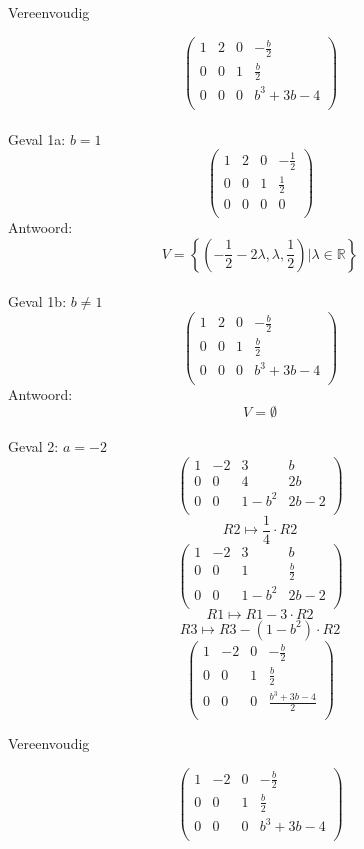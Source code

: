 \documentclass[10pt,a4paper]{article}
\begin{document}
\begin{center}
Vereenvoudig
\end{center}
\[
\begin{pmatrix}
1 & 2 & 0 & -\frac{b}{2}\\
0 & 0 & 1 & \frac{b}{2}\\
0 & 0 & 0 & b^{3}+3b-4\\
\end{pmatrix}
\]
\\Geval 1a: $b=1$
\[
\begin{pmatrix}
1 & 2 & 0 & -\frac{1}{2}\\
0 & 0 & 1 & \frac{1}{2}\\
0 & 0 & 0 & 0\\
\end{pmatrix}
\]
Antwoord:
\[
V = \left\lbrace \left(-\frac{1}{2}-2\lambda,\lambda,\frac{1}{2}\right)| \lambda \in \mathbb{R}\right\rbrace
\]
\\Geval 1b: $b\neq 1$
\[
\begin{pmatrix}
1 & 2 & 0 & -\frac{b}{2}\\
0 & 0 & 1 & \frac{b}{2}\\
0 & 0 & 0 & b^{3}+3b-4\\
\end{pmatrix}
\]
Antwoord:
\[
V = \emptyset
\]
\\Geval 2: $a=-2$
\[
\begin{pmatrix}
1 & -2 & 3 & b\\
0 & 0 & 4 & 2b\\
0 & 0 & 1-b^{2} & 2b-2\\
\end{pmatrix}
\]
\[ R2 \longmapsto \frac{1}{4}\cdot R2 \]
\[
\begin{pmatrix}
1 & -2 & 3 & b\\
0 & 0 & 1 & \frac{b}{2}\\
0 & 0 & 1-b^{2} & 2b-2\\
\end{pmatrix}
\]
\[ R1 \longmapsto R1 - 3\cdot R2 \]
\[ R3 \longmapsto R3 - (1-b^{2})\cdot R2 \]
\[
\begin{pmatrix}
1 & -2 & 0 & -\frac{b}{2}\\
0 & 0 & 1 & \frac{b}{2}\\
0 & 0 & 0 & \frac{b^3+3b-4}{2}\\
\end{pmatrix}
\]
\begin{center}
Vereenvoudig
\end{center}
\[
\begin{pmatrix}
1 & -2 & 0 & -\frac{b}{2}\\
0 & 0 & 1 & \frac{b}{2}\\
0 & 0 & 0 & b^3+3b-4\\
\end{pmatrix}
\]
\end{document}

